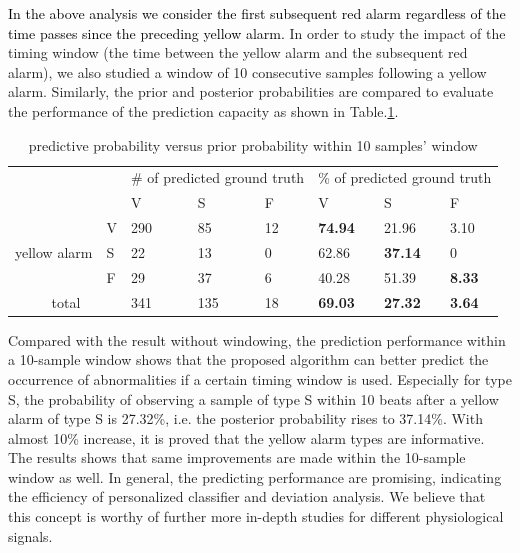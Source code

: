 \textcolor{black}{In the above analysis we consider the first subsequent red alarm regardless of the time passes since the preceding yellow alarm.} In order to study the impact of the timing window (the time between the yellow alarm and the subsequent red alarm), we also studied a window of 10 consecutive samples following a yellow alarm. Similarly, the prior and posterior probabilities are compared to evaluate the performance of the prediction capacity as shown in Table.\ref{table:pred10}. %


\begin{table}[t]
\centering
\caption{predictive probability versus prior probability within 10 samples' window}
\label{table:pred10}
\begin{tabular}{|c|l|l|l|l||l|l|l|}
\hline
\multicolumn{2}{|l|}{\multirow{2}{*}{}} & \multicolumn{3}{l|}{\# of predicted ground truth} & \multicolumn{3}{l|}{\% of predicted ground truth} \\ \cline{3-8} 
\multicolumn{2}{|l|}{}                  & V               & S               & F             & V               & S               & F             \\ \hline
\multirow{3}{*}{yellow alarm}    & V    & 290             & 85              & 12            & \textbf{74.94}  & 21.96           & 3.10          \\ \cline{2-8} 
                                 & S    & 22              & 13              & 0             & 62.86           & \textbf{37.14}  & 0             \\ \cline{2-8} 
                                 & F    & 29              & 37              & 6             & 40.28           & 51.39           & \textbf{8.33} \\ \hline
\multicolumn{2}{|c|}{total}             & 341             & 135             & 18            & \textbf{69.03}  & \textbf{27.32}  & \textbf{3.64} \\ \hline
\end{tabular}
\end{table}

Compared with the result without windowing, the prediction performance within a 10-sample window shows that the proposed algorithm can better predict the occurrence of abnormalities if a certain timing window is used. Especially for type S, the probability of observing a sample of type S within 10 beats after a yellow alarm of type S is 27.32\%, %
i.e. the posterior probability rises to 37.14\%. With almost 10\% increase, it is proved that the yellow alarm types are informative. The results shows that same improvements are made within the 10-sample window as well. In general, the predicting performance are promising, indicating the efficiency of personalized classifier and deviation analysis. We believe that this concept is worthy of further more in-depth studies for different physiological signals.




